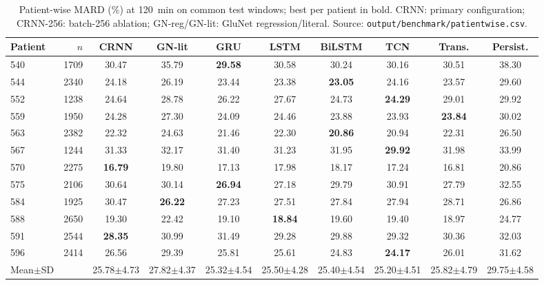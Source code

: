 \begin{table}[t]\centering
\caption{Patient-wise MARD (\%) at 120~min on common test windows; best per patient in bold. CRNN: primary configuration; CRNN-256: batch-256 ablation; GN-reg/GN-lit: GluNet regression/literal. Source: \texttt{output/benchmark/patientwise.csv}.}
\scriptsize\setlength{\tabcolsep}{3pt}
\begin{tabular}{lrcccccccc}\toprule
Patient & $n$ & CRNN & GN-lit & GRU & LSTM & BiLSTM & TCN & Trans. & Persist.\\\midrule
540 & 1709 & 30.47 & 35.79 & \textbf{29.58} & 30.58 & 30.24 & 30.16 & 30.51 & 38.30\\
544 & 2340 & 24.18 & 26.19 & 23.44 & 23.38 & \textbf{23.05} & 24.16 & 23.57 & 29.60\\
552 & 1238 & 24.64 & 28.78 & 26.22 & 27.67 & 24.73 & \textbf{24.29} & 29.01 & 29.92\\
559 & 1950 & 24.28 & 27.30 & 24.09 & 24.46 & 23.88 & 23.93 & \textbf{23.84} & 30.02\\
563 & 2382 & 22.32 & 24.63 & 21.46 & 22.30 & \textbf{20.86} & 20.94 & 22.31 & 26.50\\
567 & 1244 & 31.33 & 32.17 & 31.40 & 31.23 & 31.95 & \textbf{29.92} & 31.98 & 33.99\\
570 & 2275 & \textbf{16.79} & 19.80 & 17.13 & 17.98 & 18.17 & 17.24 & 16.81 & 20.86\\
575 & 2106 & 30.64 & 30.14 & \textbf{26.94} & 27.18 & 29.79 & 30.91 & 27.79 & 32.55\\
584 & 1925 & 30.47 & \textbf{26.22} & 27.23 & 27.51 & 27.84 & 27.94 & 28.71 & 26.86\\
588 & 2650 & 19.30 & 22.42 & 19.10 & \textbf{18.84} & 19.60 & 19.40 & 18.97 & 24.77\\
591 & 2544 & \textbf{28.35} & 30.99 & 31.49 & 29.28 & 29.88 & 29.32 & 30.36 & 32.03\\
596 & 2414 & 26.56 & 29.39 & 25.81 & 25.61 & 24.83 & \textbf{24.17} & 26.01 & 31.62\\
\midrule
Mean$\pm$SD & & 25.78$\pm$4.73 & 27.82$\pm$4.37 & 25.32$\pm$4.54 & 25.50$\pm$4.28 & 25.40$\pm$4.54 & 25.20$\pm$4.51 & 25.82$\pm$4.79 & 29.75$\pm$4.58\\
\bottomrule
\end{tabular}\end{table}
